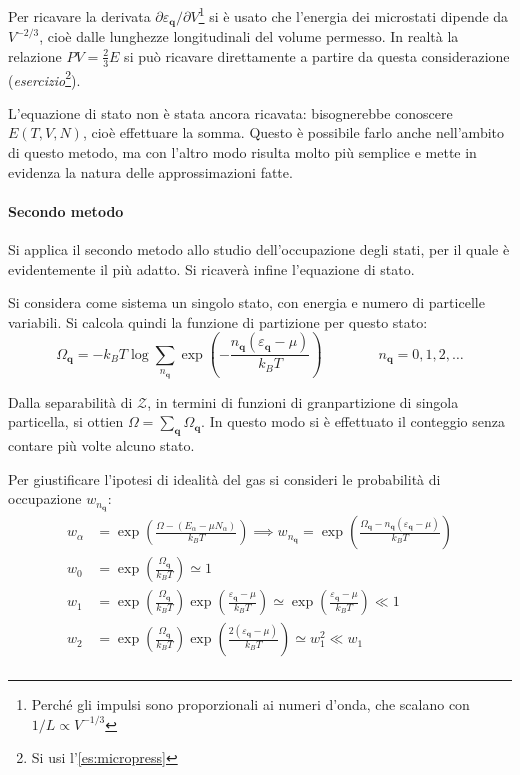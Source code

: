 Per ricavare la derivata $\partial \varepsilon_{\textbf{q}} / \partial V$\footnote{Perché gli impulsi sono proporzionali ai numeri d'onda, che scalano con $1/L \propto V^{-1/3}$} si è usato che l'energia dei microstati dipende da $V^{-2/3}$, cioè dalle lunghezze longitudinali del volume permesso. In realtà la relazione $PV = \frac{2}{3} E$ si può ricavare direttamente a partire da questa considerazione (\textit{esercizio}\footnote{Si usi l'\cref{es:micropress}}).

L'equazione di stato non è stata ancora ricavata: bisognerebbe conoscere $E(T,V,N)$, cioè effettuare la somma. Questo è possibile farlo anche nell'ambito di questo metodo, ma con l'altro modo risulta molto più semplice e mette in evidenza la natura delle approssimazioni fatte.

\paragraph{Secondo metodo} Si applica il secondo metodo allo studio dell'occupazione degli stati, per il quale è evidentemente il più adatto. Si ricaverà infine l'equazione di stato.

Si considera come sistema un singolo stato, con energia e numero di particelle variabili. Si calcola quindi la funzione di partizione per questo stato:
\begin{equation*}
\Omega_{\textbf{q}} = - k_B T \log \sum_{n_{\textbf{q}}} \exp \left( - \frac{n_{\textbf{q}}{(\varepsilon_{\textbf{q}} - \mu)}}{k_B T}\right) \qquad \qquad n_{\textbf{q}} = 0, 1, 2, \dots
\end{equation*}

Dalla separabilità di $\mathcal{Z}$, in termini di funzioni di granpartizione di singola particella, si ottien $\Omega = \sum_{\textbf{q}} \Omega_{\textbf{q}}$. In questo modo si è effettuato il conteggio senza contare più volte alcuno stato.

Per giustificare l'ipotesi di idealità del gas si consideri le probabilità di occupazione $w_{n_{\textbf{q}}}$:
\begin{align*}
w_\alpha &= \exp \left(\frac{\Omega - (E_\alpha - \mu N_\alpha)}{k_B T}\right) \implies w_{n_{\textbf{q}}} = \exp \left(\frac{\Omega_{\textbf{q}} - n_{\textbf{q}}{ (\varepsilon_{\textbf{q}} - \mu)}}{k_B T}\right)\\
w_0 &= \exp \left(\frac{\Omega_{\textbf{q}}}{k_B T}\right) \simeq 1\\
w_1 &= \exp \left(\frac{\Omega_{\textbf{q}}}{k_B T}\right) \exp \left(\frac{\varepsilon_{\textbf{q}} - \mu}{k_B T}\right)  \simeq \exp \left(\frac{\varepsilon_{\textbf{q}} - \mu}{k_B T}\right) \ll 1\\
w_2 &= \exp \left(\frac{\Omega_{\textbf{q}}}{k_B T}\right) \exp \left(\frac{2(\varepsilon_{\textbf{q}} - \mu)}{k_B T}\right)  \simeq w_1^2 \ll w_1\\ 
\end{align*}

